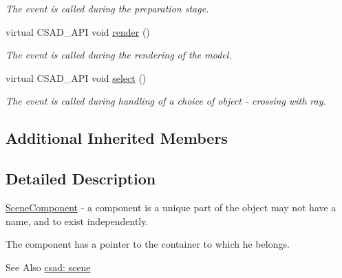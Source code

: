 \begin{DoxyCompactItemize}
\begin{DoxyCompactList}\small\item\em The event is called during the preparation stage. \end{DoxyCompactList}\item 
\hypertarget{classcsad_1_1_scene_component_ac0e685f758cbbeb8b348e7675f7c09bd}{virtual C\-S\-A\-D\-\_\-\-A\-P\-I void \hyperlink{classcsad_1_1_scene_component_ac0e685f758cbbeb8b348e7675f7c09bd}{render} ()}\label{classcsad_1_1_scene_component_ac0e685f758cbbeb8b348e7675f7c09bd}

\begin{DoxyCompactList}\small\item\em The event is called during the rendering of the model. \end{DoxyCompactList}\item 
\hypertarget{classcsad_1_1_scene_component_a79ae2a1caa07c798301566d4680097d2}{virtual C\-S\-A\-D\-\_\-\-A\-P\-I void \hyperlink{classcsad_1_1_scene_component_a79ae2a1caa07c798301566d4680097d2}{select} ()}\label{classcsad_1_1_scene_component_a79ae2a1caa07c798301566d4680097d2}

\begin{DoxyCompactList}\small\item\em The event is called during handling of a choice of object -\/ crossing with ray. \end{DoxyCompactList}\end{DoxyCompactItemize}
\subsection*{Additional Inherited Members}


\subsection{Detailed Description}
\hyperlink{classcsad_1_1_scene_component}{Scene\-Component} -\/ a component is a unique part of the object may not have a name, and to exist independently. 

The component has a pointer to the container to which he belongs.

\begin{DoxySeeAlso}{See Also}
\hyperlink{group__scene}{csad\-: scene} 
\end{DoxySeeAlso}
